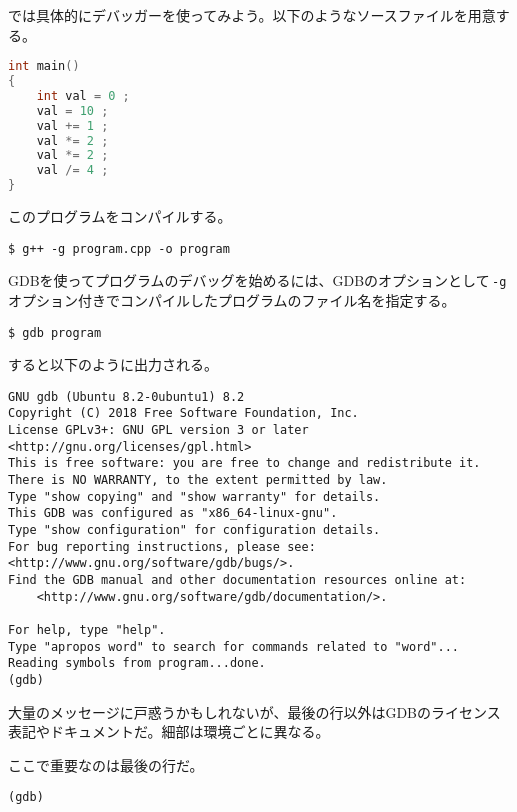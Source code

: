 
では具体的にデバッガーを使ってみよう。以下のようなソースファイルを用意する。

\begin{lstlisting}[language={C++}]
int main()
{
    int val = 0 ;
    val = 10 ;
    val += 1 ;
    val *= 2 ;
    val *= 2 ;
    val /= 4 ;
}
\end{lstlisting}

このプログラムをコンパイルする。

\begin{lstlisting}[style=terminal]
$ g++ -g program.cpp -o program
\end{lstlisting}

GDBを使ってプログラムのデバッグを始めるには、GDBのオプションとして\,\texttt{-g}\,オプション付きでコンパイルしたプログラムのファイル名を指定する。

\begin{lstlisting}[style=terminal]
$ gdb program
\end{lstlisting}

すると以下のように出力される。

\begin{lstlisting}[style=terminal]
GNU gdb (Ubuntu 8.2-0ubuntu1) 8.2
Copyright (C) 2018 Free Software Foundation, Inc.
License GPLv3+: GNU GPL version 3 or later <http://gnu.org/licenses/gpl.html>
This is free software: you are free to change and redistribute it.
There is NO WARRANTY, to the extent permitted by law.
Type "show copying" and "show warranty" for details.
This GDB was configured as "x86_64-linux-gnu".
Type "show configuration" for configuration details.
For bug reporting instructions, please see:
<http://www.gnu.org/software/gdb/bugs/>.
Find the GDB manual and other documentation resources online at:
    <http://www.gnu.org/software/gdb/documentation/>.

For help, type "help".
Type "apropos word" to search for commands related to "word"...
Reading symbols from program...done.
(gdb) 
\end{lstlisting}

大量のメッセージに戸惑うかもしれないが、最後の行以外はGDBのライセンス表記やドキュメントだ。細部は環境ごとに異なる。

ここで重要なのは最後の行だ。

\begin{lstlisting}[style=terminal]
(gdb)
\end{lstlisting}

